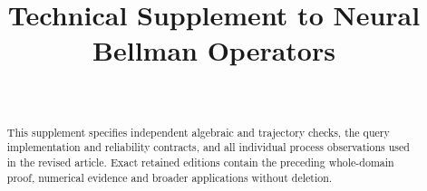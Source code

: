 \documentclass[ecta,nameyear,draft]{econsocart}
\begin{document}
\begin{frontmatter}
\title{Technical Supplement to Neural Bellman Operators}
\begin{aug}
\author[id=au1,addressref={add1}]{~}
\address[id=add1]{Peking University}
\end{aug}
\begin{abstract}
This supplement specifies independent algebraic and trajectory checks, the query implementation and reliability contracts, and all individual process observations used in the revised article. Exact retained editions contain the preceding whole-domain proof, numerical evidence and broader applications without deletion.
\end{abstract}
\end{frontmatter}



\end{document}
